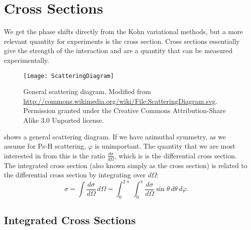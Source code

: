 \documentclass[Dissertation.tex]{subfiles}
\begin{document}
\clearpage
\pagebreak
\newpage

\chapter{Cross Sections}
\label{chp:CrossSections}


We get the phase shifts directly from the Kohn variational methods, but a more relevant quantity for experiments is the cross section. Cross sections essentially give the strength of the interaction and are a quantity that can be measured experimentally.

\begin{figure}[H]
	\centering
	\texttt{[image: ScatteringDiagram]}
	\caption[General scattering diagram]{General scattering diagram. Modified from \url{http://commons.wikimedia.org/wiki/File:ScatteringDiagram.svg}. Permission granted under the Creative Commons Attribution-Share Alike 3.0 Unported license.}
	\label{fig:ScatteringDiagram}
\end{figure}

 shows a general scattering diagram. If we have
azimuthal symmetry, as we assume for Ps-H scattering, $\varphi$ is unimportant.
The quantity that we are most interested in from this is the ratio
$\frac{d\sigma}{d\Omega}$, which is is the differential cross section.
The integrated cross section (also known simply as the cross section) is
related to the differential cross section by integrating over $d\Omega$:
\begin{equation}
\label{eq:TotalDiffCross}
\sigma = \int \frac{d\sigma}{d\Omega} \, d\Omega
 = \int_0^{2\uppi} \int_0^{\uppi} \frac{d\sigma}{d\Omega} \sin\theta \, d\theta \, d\varphi.
\end{equation}


\section{Integrated Cross Sections}
\label{sec:totalcross}
\end{document}
